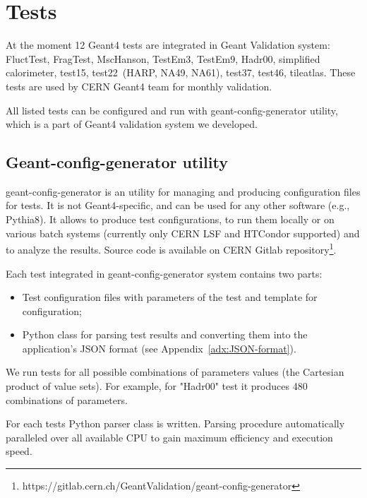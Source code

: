 \section{Tests}
\label{sec-tests}

At the moment 12 Geant4 tests are integrated in Geant Validation system: FluctTest, FragTest, MscHanson, TestEm3, TestEm9, Hadr00, simplified calorimeter, test15, test22~(HARP, NA49, NA61), test37, test46, tileatlas. These tests are used by CERN Geant4 team for monthly validation.

All listed tests can be configured and run with geant-config-generator utility, which is a part of Geant4 validation system we developed.

\subsection{Geant-config-generator utility}
\label{sec-geant-config-generator}

geant-config-generator is an utility for managing and producing configuration files for tests. It is not Geant4-specific, and can be used for any other software (e.g., Pythia8). It allows to produce test configurations, to run them locally or on various batch systems (currently only CERN LSF and HTCondor supported) and to analyze the results. Source code is available on
CERN Gitlab repository\footnote{https://gitlab.cern.ch/GeantValidation/geant-config-generator}.

Each test integrated in geant-config-generator system contains two parts:

\begin{itemize}
	\item Test configuration files with parameters of the test and template for configuration;
	\item Python class for parsing test results and converting them into the application's JSON format (see Appendix~\ref{adx:JSON-format}).
\end{itemize}

We run tests for all possible combinations of parameters values (the Cartesian product of value sets). For example, for "Hadr00" test it produces 480 combinations of parameters.

For each tests Python parser class is written. Parsing procedure automatically paralleled over all available CPU to gain maximum efficiency and execution speed.


